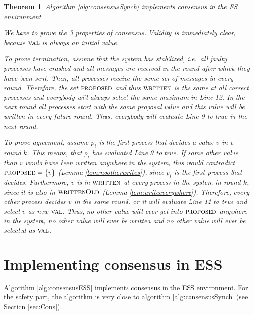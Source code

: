 \documentclass[conference, compsoc]{IEEEtran}
\newtheorem{theorem}{Theorem}
\def\val{\textsc{val}}
\def\proposed{\textsc{proposed}}
\def\written{\textsc{written}}
\def\wlr{\textsc{writtenOld}}
\begin{document}
\begin{theorem}
Algorithm \ref{alg:consensusSynch} implements consensus in the ES environment.
\begin{IEEEproof} 
We have to prove the 3 properties of consensus. Validity is immediately clear, because $\val$ is always an initial value.

To prove termination, assume that the system has stabilized, i.e.~all faulty processes have crashed and all messages are received in the round after which they have been sent. Then, all processes receive the same set of messages in every round. Therefore, the set $\proposed$ and thus $\written$ is the same at all correct processes and everybody will always select the same maximum in Line 12. In the next round all processes start with the same proposal value and this value will be written in every future round. Thus, everybody will evaluate Line 9 to true in the next round.    

To prove agreement, assume $p_i$ is the first process that decides a value $v$ in a round $k$. This means, that $p_i$ has evaluated Line 9 to true. If some other value than $v$ would have been written anywhere in the system, this would contradict $\proposed = \{v\}$ (Lemma \ref{lem:nootherwrites}), since $p_i$ is the first process that decides. Furthermore, $v$ is in $\written$ at every process in the system in round $k$, since it is also in $\wlr$ (Lemma \ref{lem:writeeverywhere}). Therefore, every other process decides $v$ in the same round, or it will evaluate Line 11 to true and select $v$ as new $\val$. Thus, no other value will ever get into $\proposed$ anywhere in the system, no other value will ever be written and no other value will ever be selected as $\val$.

\end{IEEEproof}
\end{theorem}

\section{Implementing consensus in ESS} \label{sec:ConsESS}

Algorithm \ref{alg:consensusESS} implements consensus in the ESS environment. For the safety part, the algorithm is very close to algorithm \ref{alg:consensusSynch} (see Section \ref{sec:Cons}). 
\end{document}
